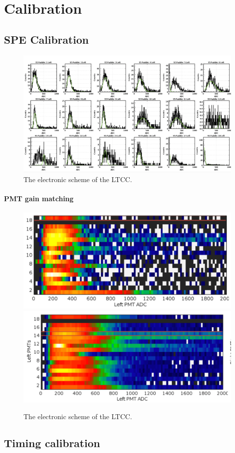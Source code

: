 \section{Calibration}

\subsection{SPE Calibration}

\begin{figure}
	\centering
	\includegraphics[width=0.95\columnwidth,keepaspectratio]{img/spe.png}
	\caption{The electronic scheme of the LTCC.}
	\label{fig:speCalibration}
\end{figure}


\paragraph{PMT gain matching}


\begin{figure}
	\centering
	\includegraphics[width=0.95\columnwidth,keepaspectratio]{img/gainMatchingBefore.png}
	\includegraphics[width=0.95\columnwidth,keepaspectratio]{img/gainMatchingAfter.png}
	\caption{The electronic scheme of the LTCC.}
	\label{fig:gainMatching}
\end{figure}

\subsection{Timing calibration}



